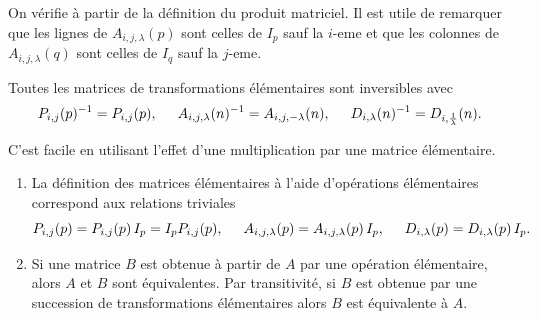 \begin{demo}
 On vérifie à partir de la définition du produit matriciel. Il est utile de remarquer que les lignes de $A_{i,j,\lambda}(p)$ sont celles de $I_p$ sauf la $i$-eme et que les colonnes de $A_{i,j,\lambda}(q)$ sont celles de $I_q$ sauf la $j$-eme.
\end{demo}
\begin{prop}
 Toutes les matrices de transformations élémentaires sont inversibles avec 
\[
 P_{i,j}(p)^{-1}=P_{i,j}(p),\hspace{0.5cm} A_{i,j,\lambda}(n)^{-1}=A_{i,j,-\lambda}(n),\hspace{0.5cm}
D_{i,\lambda}(n)^{-1}=D_{i,\frac{1}{\lambda}}(n).
\]
\end{prop}
\begin{demo}
 C'est facile en utilisant l'effet d'une multiplication par une matrice élémentaire.
\end{demo}
\begin{rems}
\begin{enumerate}
  \item La définition des matrices élémentaires à l'aide d'opérations élémentaires correspond aux relations triviales
\[ 
P_{i,j}(p) = P_{i,j}(p)\, I_p = I_p P_{i,j}(p),\hspace{0.5cm} A_{i,j,\lambda}(p) = A_{i,j,\lambda}(p)\,I_p,\hspace{0.5cm} D_{i,\lambda}(p) = D_{i,\lambda}(p)\, I_p. 
\]
  \item Si une matrice $B$ est obtenue à partir de $A$ par une opération élémentaire, alors $A$ et $B$ sont équivalentes. Par transitivité, si $B$ est obtenue par une succession de transformations élémentaires alors $B$ est équivalente à $A$.
\end{enumerate}
\end{rems}

